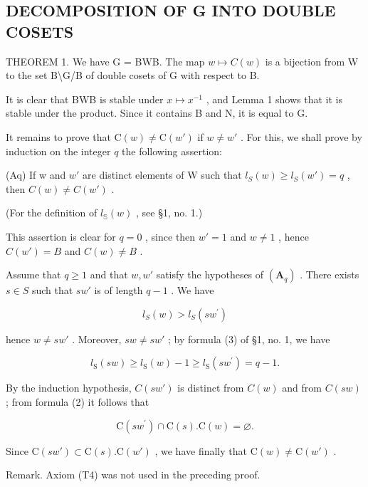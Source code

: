 \subsection{DECOMPOSITION OF G INTO DOUBLE COSETS}

THEOREM 1. We have G = BWB. The map \(w \mapsto C(w)\) is a bijection from W to the set B\textbackslash G/B of double cosets of G with respect to B.

It is clear that BWB is stable under \(x \mapsto x^{-1}\) , and Lemma 1 shows that it is stable under the product. Since it contains B and N, it is equal to G.

It remains to prove that \(\mathrm{C}(w) \neq \mathrm{C}(w')\) if \(w \neq w'\) . For this, we shall prove by induction on the integer \(q\) the following assertion:

(Aq) If w and \(w'\) are distinct elements of W such that \(l_{S}(w) \geqslant l_{S}(w') = q\) , then \(C(w) \neq C(w')\) .

(For the definition of \(l_{\mathbb{S}}(w)\) , see §1, no. 1.)

This assertion is clear for \(q = 0\) , since then \(w' = 1\) and \(w \neq 1\) , hence \(C(w') = B\) and \(C(w) \neq B\) .

Assume that \(q \geqslant 1\) and that \(w, w'\) satisfy the hypotheses of \((\mathbf{A}_q)\) . There exists \(s \in S\) such that \(sw'\) is of length \(q - 1\) . We have

\[
l _ {S} (w) > l _ {S} \left(s w ^ {\prime}\right)\tag{6}
\]

hence \(w \neq sw'\) . Moreover, \(sw \neq sw'\) ; by formula (3) of §1, no. 1, we have

\[
l _ {\mathrm{S}} (s w) \geqslant l _ {\mathrm{S}} (w) - 1 \geqslant l _ {\mathrm{S}} (s w ^ {\prime}) = q - 1.\tag{7}
\]

By the induction hypothesis, \(C(sw')\) is distinct from \(C(w)\) and from \(C(sw)\) ; from formula (2) it follows that

\[
\mathrm{C} (s w ^ {\prime}) \cap \mathrm{C} (s). \mathrm{C} (w) = \varnothing .\tag{8}
\]

Since \(\mathrm{C}(sw') \subset \mathrm{C}(s).\mathrm{C}(w')\) , we have finally that \(\mathrm{C}(w) \neq \mathrm{C}(w')\) .

Remark. Axiom (T4) was not used in the preceding proof.

